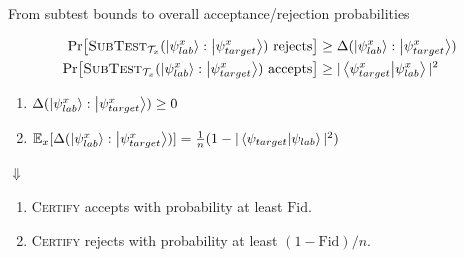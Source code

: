 \begin{frame}{From subtest bounds to overall acceptance/rejection probabilities}
    \small %
    \begin{theorem}
    \vspace{-0.8em}
        \begin{align*}
            \Pr[\textsc{SubTest}_{\mathcal{T}_x}(\ket{\psi_{lab}^x}:\ket{\psi_{target}^x}) \text{ rejects}] &\geq \Delta(\ket{\psi_{lab}^x}:\ket{\psi_{target}^x}) \\
            \Pr[\textsc{SubTest}_{\mathcal{T}_x}(\ket{\psi_{lab}^x}:\ket{\psi_{target}^x}) \text{ accepts}] &\geq |\braket{\psi_{target}^x}{\psi_{lab}^x}|^2
        \end{align*}
    \end{theorem}

    \begin{lemma}\label{rem:nonneg}
        \begin{enumerate}
            \item $\Delta(\ket{\psi_{lab}^x} : \ket{\psi_{target}^x}) \geq 0$ 
            \item $\mathbb{E}_{x}[\Delta(\ket{\psi_{lab}^x}:\ket{\psi_{target}^x})] = \frac{1}{n}(1 - |\braket{\psi_{target}}{\psi_{lab}}|^2)$
        \end{enumerate}
    \end{lemma}

    \begin{center}
        {\huge $\Downarrow$ } 
    \end{center}

    \normalsize %
    \begin{theorem} 
        \begin{enumerate}
            \item \textsc{Certify} accepts with probability at least $\mathrm{Fid}$.
            \item \textsc{Certify} rejects with probability at least $(1-\mathrm{Fid})/n$.
        \end{enumerate}
    \end{theorem}
\end{frame}

